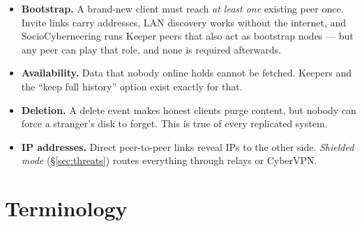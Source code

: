 \documentclass[11pt,a4paper]{article}
\begin{document}
\begin{honest}
\begin{itemize}[leftmargin=1.2em]
  \item \textbf{Bootstrap.} A brand-new client must reach \emph{at least one} existing peer
        once. Invite links carry addresses, LAN discovery works without the internet, and
        SocioCyberneering runs Keeper peers that also act as bootstrap nodes --- but any
        peer can play that role, and none is required afterwards.
  \item \textbf{Availability.} Data that nobody online holds cannot be fetched. Keepers and
        the ``keep full history'' option exist exactly for that.
  \item \textbf{Deletion.} A delete event makes honest clients purge content, but nobody can
        force a stranger's disk to forget. This is true of every replicated system.
  \item \textbf{IP addresses.} Direct peer-to-peer links reveal IPs to the other side.
        \emph{Shielded mode} (\S\ref{sec:threats}) routes everything through relays or CyberVPN.
\end{itemize}
\end{honest}

\section{Terminology}
\end{document}
